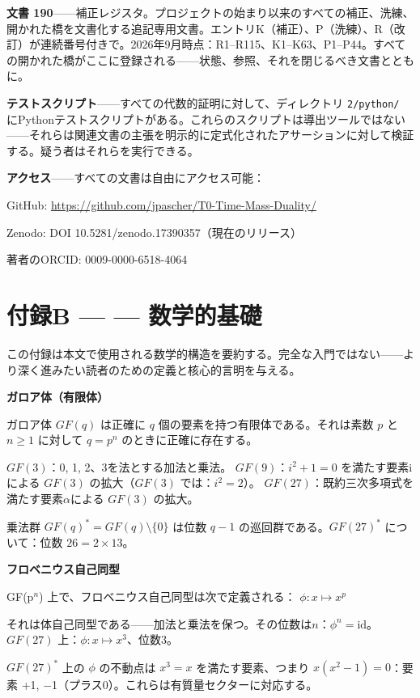 \documentclass[11pt,openany]{book}
\begin{document}
\textbf{文書 190}——補正レジスタ。プロジェクトの始まり以来のすべての補正、洗練、開かれた橋を文書化する追記専用文書。エントリK（補正）、P（洗練）、R（改訂）が連続番号付きで。2026年9月時点：R1–R115、K1–K63、P1–P44。すべての開かれた橋がここに登録される——状態、参照、それを閉じるべき文書とともに。

\textbf{テストスクリプト}——すべての代数的証明に対して、ディレクトリ \texttt{2/python/} にPythonテストスクリプトがある。これらのスクリプトは導出ツールではない——それらは関連文書の主張を明示的に定式化されたアサーションに対して検証する。疑う者はそれらを実行できる。

\textbf{アクセス}——すべての文書は自由にアクセス可能：

GitHub: \url{https://github.com/jpascher/T0-Time-Mass-Duality/}

Zenodo: DOI 10.5281/zenodo.17390357（現在のリリース）

著者のORCID: 0009-0000-6518-4064

\medskip

\chapter*{付録B — — 数学的基礎}

この付録は本文で使用される数学的構造を要約する。完全な入門ではない——より深く進みたい読者のための定義と核心的言明を与える。

\textbf{ガロア体（有限体）}

ガロア体 $GF(q)$ は正確に $q$ 個の要素を持つ有限体である。それは素数 $p$ と $n \geq 1$ に対して $q = p^n$ のときに正確に存在する。

$GF(3)$：{0, 1, 2}、3を法とする加法と乗法。
$GF(9)$：$i^2 + 1 = 0$ を満たす要素iによる $GF(3)$ の拡大（$GF(3)$ では：$i^2 = 2$）。
$GF(27)$：既約三次多項式を満たす要素$\alpha$による $GF(3)$ の拡大。

乗法群 $GF(q)^* = GF(q)\setminus\{0\}$ は位数 $q-1$ の巡回群である。$GF(27)^*$ について：位数 $26 = 2\times 13$。

\textbf{フロベニウス自己同型}

GF(p$^n$) 上で、フロベニウス自己同型は次で定義される：
$\phi: x \mapsto x^p$

それは体自己同型である——加法と乗法を保つ。その位数は$n$：$\phi^n = \mathrm{id}$。$GF(27)$ 上：$\phi: x \mapsto x^3$、位数3。

$GF(27)^*$ 上の $\phi$ の不動点は $x^3 = x$ を満たす要素、つまり $x(x^2-1) = 0$：要素 {+1, $-$1}（プラス0）。これらは有質量セクターに対応する。
\end{document}
